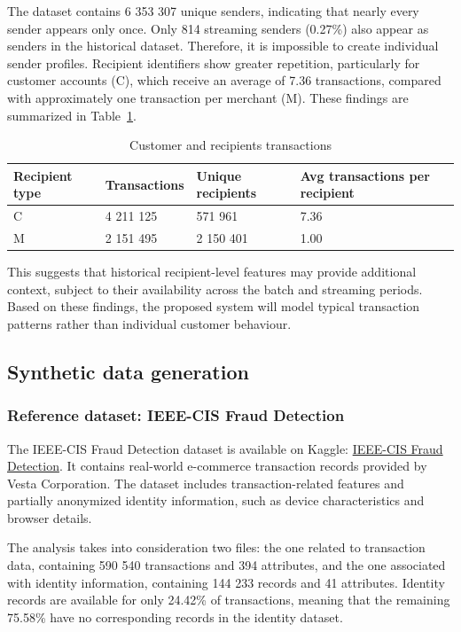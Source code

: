 \documentclass[titlepage]{article}
\begin{document}
The dataset contains 6 353 307 unique senders, indicating that nearly every sender appears only once. Only 814 streaming senders (0.27\%) also appear as senders in the historical dataset. Therefore, it is impossible to create individual sender profiles. Recipient identifiers show greater repetition, particularly for customer accounts (C), which receive an average of 7.36 transactions, compared with approximately one transaction per merchant (M). These findings are summarized in Table~\ref{tab:C_R_transactions}.
\begin{table}[H]
    \centering
    \caption{Customer and recipients transactions}
    \label{tab:C_R_transactions}
    \begin{tabular}{llll}
        \toprule
        \textbf{Recipient type} & \textbf{Transactions}  & \textbf{Unique recipients} & \textbf{Avg transactions per recipient}\\
        \midrule
        C & 4 211 125 & 571 961 & 7.36 \\
        M & 2 151 495 & 2 150 401 & 1.00 \\
        \bottomrule
    \end{tabular}
\end{table}
This suggests that historical recipient-level features may provide additional context, subject to their availability across the batch and streaming periods. Based on these findings, the proposed system will model typical transaction patterns rather than individual customer behaviour.

\subsection{Synthetic data generation}
\subsubsection{Reference dataset: IEEE-CIS Fraud Detection}
The IEEE-CIS Fraud Detection dataset is available on Kaggle: \href{https://www.kaggle.com/competitions/ieee-fraud-detection}{IEEE-CIS Fraud Detection}. It contains real-world e-commerce transaction records provided by Vesta Corporation. The dataset includes transaction-related features and partially anonymized identity information, such as device characteristics and browser details.

The analysis takes into consideration two files: the one related to transaction data, containing 590 540 transactions and 394 attributes, and the one associated with identity information, containing 144 233 records and 41 attributes. Identity records are available for only 24.42\% of transactions, meaning that the remaining 75.58\% have no corresponding records in the identity dataset. \\
\end{document}
